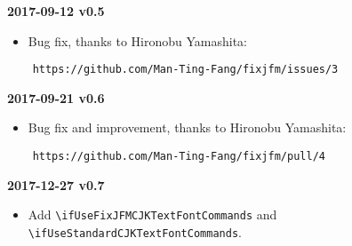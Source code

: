 \documentclass[a4paper]{article}
\newenvironment{history}[1]%
  {\noindent\textbf{#1}\begin{itemize}}%
  {\end{itemize}}
\begin{document}
\begin{history}{2017-09-12 v0.5}
\item Bug fix, thanks to Hironobu Yamashita:
\end{history}
\begin{verbatim}
    https://github.com/Man-Ting-Fang/fixjfm/issues/3
\end{verbatim}

\begin{history}{2017-09-21 v0.6}
\item Bug fix and improvement, thanks to Hironobu Yamashita:
\end{history}
\begin{verbatim}
    https://github.com/Man-Ting-Fang/fixjfm/pull/4
\end{verbatim}

\begin{history}{2017-12-27 v0.7}
\item Add \verb|\ifUseFixJFMCJKTextFontCommands| and
  \verb|\ifUseStandardCJKTextFontCommands|.
\end{history}
\end{document}
